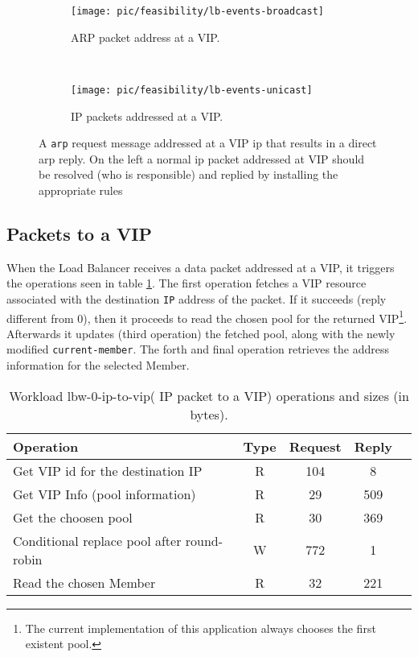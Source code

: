 \begin{figure}
  \centering
  \begin{subfigure}[b]{0.5\textwidth}
                \centering
                \texttt{[image: pic/feasibility/lb-events-broadcast]}
                \caption{ARP packet address at a VIP.}
                \label{fig:lb:interaction:arp2Vip}
        \end{subfigure}%
        ~
        \begin{subfigure}[b]{0.5\textwidth}
                \centering
                \texttt{[image: pic/feasibility/lb-events-unicast]}
                \caption{IP packets addressed at a VIP. }
                \label{fig:lb:interaction:ip2Vip}
        \end{subfigure}
        \caption[Load Balancer workload events]{A \texttt{\gls{arp}} request message addressed at a VIP \gls{ip} that results in a direct \gls{arp} reply. On the left a normal \gls{ip} packet addressed at VIP should be resolved (who is responsible) and replied by installing the appropriate rules}  
        \label{fig:lb:interaction}
\end{figure}

\subsection{Packets to a VIP}
When the Load Balancer  receives a data packet addressed
at a VIP, it triggers the operations seen in table
\ref{table:lbw-0-ip-to-vip}. 
The first operation fetches a VIP resource associated with the
destination \texttt{IP} address of the packet.
If it succeeds (reply different from 0), then it proceeds to read 
the chosen pool for the returned  VIP\footnote{The current implementation of this
application always chooses the first existent pool.}.
Afterwards it updates (third operation) the fetched  pool, along with the newly modified
\texttt{current-member}.
The forth and final operation retrieves
the address information for the selected  Member. 



\begin{table}[H]
\centering 
\begin{tabular}{l c c c c}
 Operation & Type & Request & Reply \\ \toprule 
 
Get VIP id for the destination IP & R & 104 & 8\\\midrule
Get VIP Info (pool information) & R & 29 & 509\\\midrule
Get the choosen pool & R & 30 & 369\\\midrule
Conditional replace pool after round-robin & W & 772 & 1\\\midrule
Read the chosen Member & R & 32 & 221 \\\bottomrule
\end{tabular}\caption[Workload lbw-0-ip-to-vip( IP packet to a VIP)
operations]{Workload lbw-0-ip-to-vip( IP packet to a VIP) operations
  and sizes (in bytes).}
\label{table:lbw-0-ip-to-vip}
\end{table}



